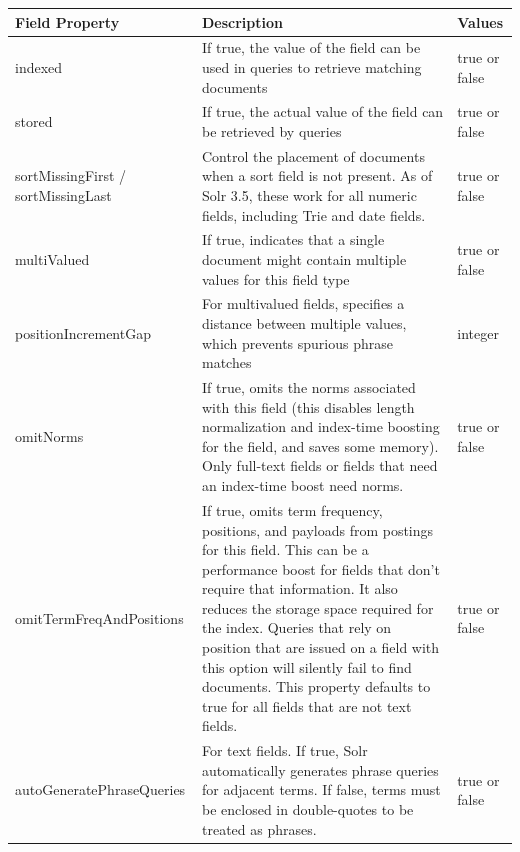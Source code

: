\begin{longtable}{| p{4.5cm} | p{8.5cm} | p{2cm} |}
    \hline
    Field Property & Description & Values \\ \hline
    indexed & If true, the value of the field can be used in queries to retrieve matching documents & true or false\\ \hline
    stored &  If true, the actual value of the field can be retrieved by queries & true or false\\ \hline
    sortMissingFirst / sortMissingLast & Control the placement of documents when a sort field is not present. As of Solr 3.5, these work for all numeric fields, including Trie and date fields. & true or false\\ \hline
    multiValued & If true, indicates that a single document might contain multiple values for this field type & true or false\\ \hline
    positionIncrementGap & For multivalued fields, specifies a distance between multiple values, which prevents spurious phrase matches & integer\\ \hline
    omitNorms & If true, omits the norms associated with this field (this disables length normalization and index-time boosting for the field, and saves some memory). Only full-text fields or fields that need an index-time boost need norms. & true or false\\ \hline
    omitTermFreqAndPositions & If true, omits term frequency, positions, and payloads from postings for this field. This can be a performance boost for fields that don't require that information. It also reduces the storage space required for the index. Queries that rely on position that are issued on a field with this option will silently fail to find documents. This property defaults to true for all fields that are not text fields. & true or false\\ \hline
    autoGeneratePhraseQueries & For text fields. If true, Solr automatically generates phrase queries for adjacent terms. If false, terms must be enclosed in double-quotes to be treated as phrases. & true or false\\ \hline
\end{longtable}

\newpage
\inputminted[fontsize=\scriptsize,linenos]{xml}{./code_examples/schema_fieldtype.xml}

